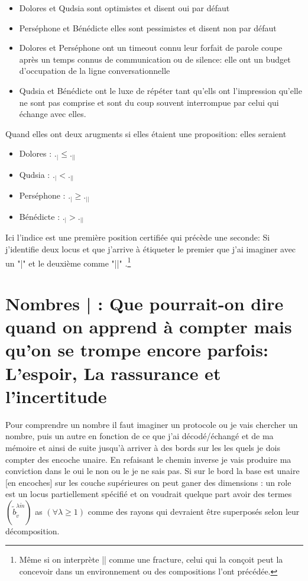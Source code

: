 \documentclass{article}
\begin{document}
\begin{itemize}
\item  Dolores  et Qudsia sont optimistes et disent oui par défaut
\item Perséphone et Bénédicte elles sont pessimistes et disent non par défaut
\item Dolores et Perséphone ont un timeout connu leur forfait de parole coupe après un temps connus de communication ou de silence: elle ont un budget d'occupation de la ligne conversationnelle
\item Qudsia et Bénédicte ont le luxe de répéter tant qu'ells ont l'impression qu'elle ne sont pas comprise et sont du coup souvent interrompue par celui qui échange avec elles.
\end{itemize}

Quand elles ont deux arugments si elles étaient une proposition: elles seraient 
\begin{itemize}
\item Dolores : $._| \le ._{||} $
\item Qudsia : $._| < ._{||} $
\item Perséphone : $._| \ge  ._{||} $
\item Bénédicte : $._| > ._{||} $
\end{itemize}

 Ici l'indice est une première position certifiée qui précède une seconde: Si j'identifie deux locus et que j'arrive à étiqueter le premier que j'ai imaginer avec un "|" et le deuxième comme "||" .\footnote{Même si on interprète || comme une fracture,  celui qui la conçoit peut la concevoir dans un environnement ou des compositions l'ont précédée.}
\section{Nombres | : Que pourrait-on dire quand on apprend à  compter mais qu'on se trompe encore parfois: L'espoir, La rassurance et l'incertitude}

Pour comprendre un nombre il faut imaginer un protocole ou je vais chercher un nombre, puis un autre en fonction de ce que j'ai décodé/échangé et de ma mémoire et ainsi de suite jusqu'à arriver à des bords sur les les quels je dois compter des encoche unaire. En refaisant le chemin inverse je vais produire ma conviction dans le oui le non ou le je ne sais pas.
Si sur le bord la base est unaire [en encoches] sur les couche supérieures on peut ganer des dimensions : un role est un locus partiellement spécifié et on 
voudrait quelque part avoir des termes $(\tilde b^{\lambda \tilde m}_{\tilde v})$ as $(\forall \lambda \ge 1)$ comme des rayons qui devraient être superposés selon leur décomposition.
\end{document}
